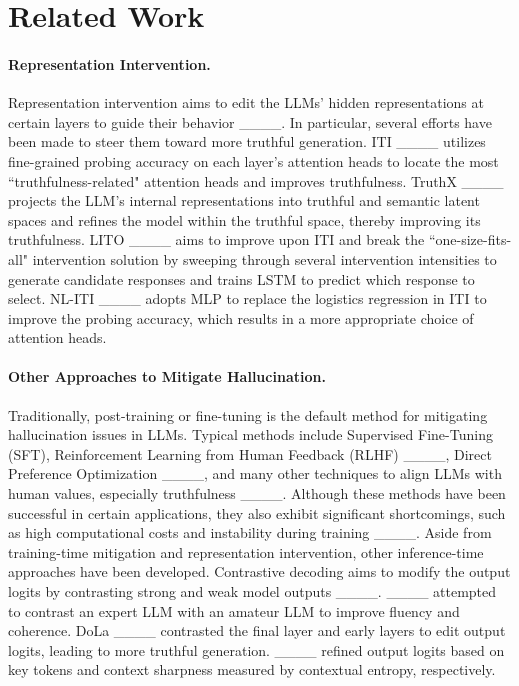 \section{Related Work}
\label{sec:related_work}

\paragraph{Representation Intervention.}
Representation intervention aims to edit the LLMs' hidden representations at certain layers to guide their behavior ____. In particular, several efforts have been made to steer them toward more truthful generation. ITI ____ utilizes fine-grained probing accuracy on each layer's attention heads to locate the most ``truthfulness-related" attention heads and improves truthfulness. TruthX ____ projects the LLM's internal representations into truthful and semantic latent spaces and refines the model within the truthful space, thereby improving its truthfulness. LITO ____ aims to improve upon ITI and break the ``one-size-fits-all" intervention solution by sweeping through several intervention intensities to generate candidate responses and trains LSTM to predict which response to select. NL-ITI ____ adopts MLP to replace the logistics regression in ITI to improve the probing accuracy, which results in a more appropriate choice of attention heads.

\paragraph{Other Approaches to Mitigate Hallucination.} Traditionally, post-training or fine-tuning is the default method for mitigating hallucination issues in LLMs. Typical methods include Supervised Fine-Tuning (SFT), Reinforcement Learning from Human Feedback (RLHF) ____, Direct Preference Optimization ____, and many other techniques to align LLMs with human values, especially truthfulness ____. Although these methods have been successful in certain applications, they also exhibit significant shortcomings, such as high computational costs and instability during training ____. 
Aside from training-time mitigation and representation intervention, other inference-time approaches have been developed. Contrastive decoding aims to modify the output logits by contrasting strong and weak model outputs ____. ____ attempted to contrast an expert LLM with an amateur LLM to improve fluency and coherence. DoLa ____ contrasted the final layer and early layers to edit output logits, leading to more truthful generation. ____ refined output logits based on key tokens and context sharpness measured by contextual entropy, respectively.